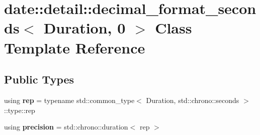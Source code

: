 \hypertarget{classdate_1_1detail_1_1decimal__format__seconds_3_01_duration_00_010_01_4}{}\section{date\+::detail\+::decimal\+\_\+format\+\_\+seconds$<$ Duration, 0 $>$ Class Template Reference}
\label{classdate_1_1detail_1_1decimal__format__seconds_3_01_duration_00_010_01_4}
\subsection*{Public Types}
\begin{DoxyCompactItemize}
\item 
\mbox{\label{classdate_1_1detail_1_1decimal__format__seconds_3_01_duration_00_010_01_4_a9faa9e8891872ba8e7eb19a43047cf94}} 
using {\bfseries rep} = typename std\+::common\+\_\+type$<$ Duration, std\+::chrono\+::seconds $>$\+::type\+::rep
\item 
\mbox{\label{classdate_1_1detail_1_1decimal__format__seconds_3_01_duration_00_010_01_4_a13ada956d373bc69ec395ae5ce535752}} 
using {\bfseries precision} = std\+::chrono\+::duration$<$ rep $>$
\end{DoxyCompactItemize}
